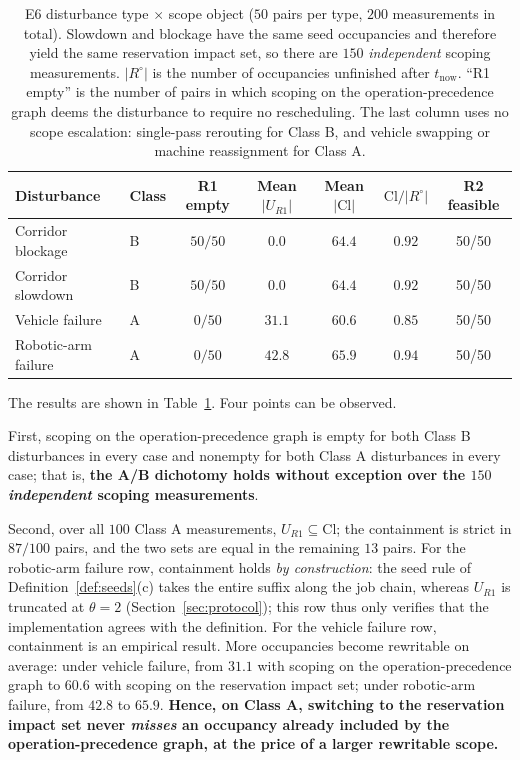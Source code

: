 \documentclass[manuscript,screen,review]{acmart}
\newcommand{\NPairs}{50}
\newcommand{\StrictlyLarger}{87/100}
\newcommand{\FeasESixBlock}{\NPairs/\NPairs}
\newcommand{\FeasSlow}{\NPairs/\NPairs}
\newcommand{\FeasESixAgv}{\NPairs/\NPairs}
\newcommand{\FeasESixRa}{\NPairs/\NPairs}
\begin{document}
\begin{table}[t]
\centering
\caption{E6 disturbance type \(\times\) scope object (\(\NPairs\) pairs per type, \(200\) measurements in total).
Slowdown and blockage have the same seed occupancies and therefore yield the same reservation impact set, so there are \(150\) \emph{independent} scoping measurements.
\(|R^{\circ}|\) is the number of occupancies unfinished after \(t_{\mathrm{now}}\).
``R1 empty'' is the number of pairs in which scoping on the operation-precedence graph deems the disturbance to require no rescheduling.
The last column uses no scope escalation: single-pass rerouting for Class B, and vehicle swapping or machine reassignment for Class A.}
\label{tab:e6}
\small
\begin{tabular}{@{}llccccc@{}}
\toprule
Disturbance & Class & R1 empty & Mean \(|U_{R1}|\) & Mean \(|\mathrm{Cl}|\)
 & \(\mathrm{Cl}/|R^{\circ}|\) & R2 feasible \\
\midrule
Corridor blockage   & B & \(50/50\) & \(0.0\)  & \(64.4\) & \(0.92\) & \FeasESixBlock \\
Corridor slowdown & B & \(50/50\) & \(0.0\)  & \(64.4\) & \(0.92\) & \FeasSlow \\
Vehicle failure   & A & \(0/50\)  & \(31.1\) & \(60.6\) & \(0.85\) & \FeasESixAgv \\
Robotic-arm failure & A & \(0/50\)  & \(42.8\) & \(65.9\) & \(0.94\) & \FeasESixRa \\
\bottomrule
\end{tabular}
\end{table}

The results are shown in Table~\ref{tab:e6}. Four points can be observed.

First, scoping on the operation-precedence graph is empty for both Class B disturbances in every case and nonempty for both Class A disturbances in every case;
that is, \textbf{the A/B dichotomy holds without exception over the \(150\) \emph{independent} scoping measurements}.

Second, over all \(100\) Class A measurements, \(U_{R1}\subseteq\mathrm{Cl}\); the containment is strict in \(\StrictlyLarger\) pairs, and the two sets are equal in the remaining \(13\) pairs.
For the robotic-arm failure row, containment holds \emph{by construction}: the seed rule of Definition~\ref{def:seeds}(c) takes the entire suffix along the job chain,
whereas \(U_{R1}\) is truncated at \(\theta=2\) (Section~\ref{sec:protocol}); this row thus only verifies that the implementation agrees with the definition.
For the vehicle failure row, containment is an empirical result.
More occupancies become rewritable on average: under vehicle failure, from \(31.1\) with scoping on the operation-precedence graph to \(60.6\) with scoping on the reservation impact set;
under robotic-arm failure, from \(42.8\) to \(65.9\).
\textbf{Hence, on Class A, switching to the reservation impact set never \emph{misses} an occupancy already included by the operation-precedence graph, at the price of a larger rewritable scope.}
\end{document}
